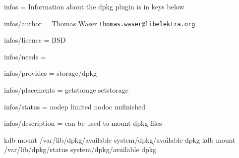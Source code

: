 
\begin{DoxyItemize}
\item infos = Information about the dpkg plugin is in keys below
\item infos/author = Thomas Waser \href{mailto:thomas.waser@libelektra.org}{\tt thomas.\+waser@libelektra.\+org}
\item infos/licence = B\+SD
\item infos/needs =
\item infos/provides = storage/dpkg
\item infos/placements = getstorage setstorage
\item infos/status = nodep limited nodoc unfinished
\item infos/description = can be used to mount dpkg files
\end{DoxyItemize}

\begin{DoxyVerb}kdb mount /var/lib/dpkg/available system/dpkg/available dpkg
kdb mount /var/lib/dpkg/status system/dpkg/available dpkg\end{DoxyVerb}
 